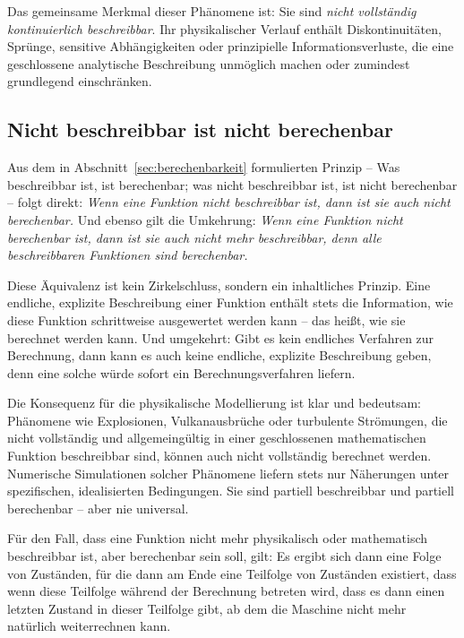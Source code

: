 ﻿\documentclass[12pt, a4paper]{article}
\begin{document}
	Das gemeinsame Merkmal dieser Phänomene ist: Sie sind \textit{nicht vollständig kontinuierlich beschreibbar}. Ihr physikalischer Verlauf enthält Diskontinuitäten, Sprünge, sensitive Abhängigkeiten oder prinzipielle Informationsverluste, die eine geschlossene analytische Beschreibung unmöglich machen oder zumindest grundlegend einschränken.

	\subsection{Nicht beschreibbar ist nicht berechenbar}

	Aus dem in Abschnitt~\ref{sec:berechenbarkeit} formulierten Prinzip -- Was beschreibbar ist, ist berechenbar; was nicht beschreibbar ist, ist nicht berechenbar -- folgt direkt: \textit{Wenn eine Funktion nicht beschreibbar ist, dann ist sie auch nicht berechenbar.}  Und ebenso gilt die Umkehrung: \textit{Wenn eine Funktion nicht berechenbar ist, dann ist sie auch nicht mehr beschreibbar, denn alle beschreibbaren Funktionen sind berechenbar.}

	Diese Äquivalenz ist kein Zirkelschluss, sondern ein inhaltliches Prinzip. Eine endliche, explizite Beschreibung einer Funktion enthält stets die Information, wie diese Funktion schrittweise ausgewertet werden kann -- das heißt, wie sie berechnet werden kann. Und umgekehrt: Gibt es kein endliches Verfahren zur Berechnung, dann kann es auch keine endliche, explizite Beschreibung geben, denn eine solche würde sofort ein Berechnungsverfahren liefern.

	Die Konsequenz für die physikalische Modellierung ist klar und bedeutsam: Phänomene wie Explosionen, Vulkanausbrüche oder turbulente Strömungen, die nicht vollständig und allgemeingültig in einer geschlossenen mathematischen Funktion beschreibbar sind, können auch nicht vollständig berechnet werden. Numerische Simulationen solcher Phänomene liefern stets nur Näherungen unter spezifischen, idealisierten Bedingungen. Sie sind partiell beschreibbar und partiell berechenbar -- aber nie universal.

	Für den Fall, dass eine Funktion nicht mehr physikalisch oder mathematisch beschreibbar ist, aber berechenbar sein soll, gilt: Es ergibt sich dann eine Folge von Zuständen, für die dann am Ende eine Teilfolge von Zuständen existiert, dass wenn diese Teilfolge während der Berechnung betreten wird, dass es dann einen letzten Zustand in dieser Teilfolge gibt, ab dem die Maschine nicht mehr natürlich weiterrechnen kann.
\end{document}

